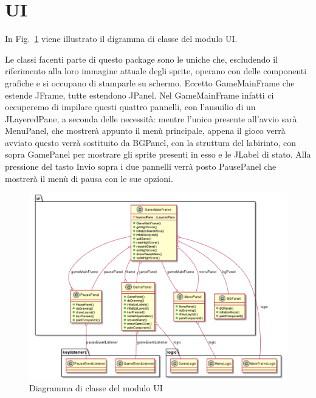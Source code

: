 \documentclass[12pt,a4paper]{report}
\begin{document}


\section{UI}\label{se:arch.ui}
In Fig.~\ref{fig:ui} viene illustrato il digramma di classe del modulo UI.\newline

Le classi facenti parte di questo package sono le uniche che, escludendo il riferimento alla loro immagine attuale degli sprite, operano con delle componenti grafiche e si occupano di stamparle su schermo. Eccetto GameMainFrame che estende JFrame, tutte estendono JPanel. Nel GameMainFrame infatti ci occuperemo di impilare questi quattro pannelli, con l’ausuilio di un JLayeredPane, a seconda delle necessità: mentre l’unico presente all’avvio sarà MenuPanel, che mostrerà appunto il menù principale, appena il gioco verrà avviato questo verrà sostituito da BGPanel, con la struttura del labirinto, con sopra GamePanel per mostrare gli sprite presenti in esso e le JLabel di stato. Alla pressione del tasto Invio sopra i due pannelli verrà posto PausePanel che mostrerà il menù di pausa con le sue opzioni.

\begin{figure}[tb]
  \includegraphics[width=\linewidth]{ui}
  \caption{Diagramma di classe del modulo UI}
  \label{fig:ui}
\end{figure}

\end{document}
